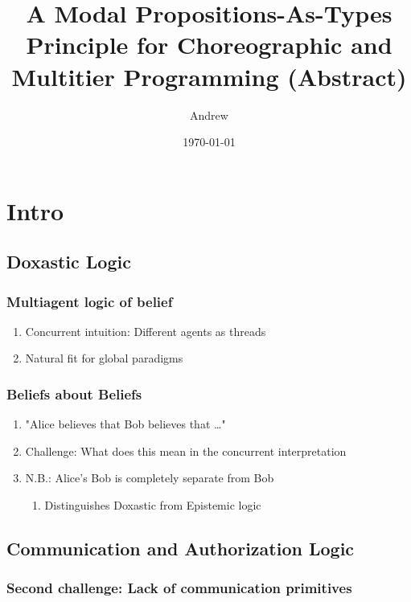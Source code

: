 \documentclass[11pt]{article}
\author{Andrew}
\date{\today}
\title{A Modal Propositions-As-Types Principle for Choreographic and Multitier Programming (Abstract)}
\begin{document}
\maketitle


\section{Intro}
\label{sec:org9bb3d42}
\subsection{Doxastic Logic}
\label{sec:org2422f84}
\subsubsection{Multiagent logic of belief}
\label{sec:org404c910}
\begin{enumerate}
\item Concurrent intuition: Different agents as threads
\label{sec:org0226ebc}
\item Natural fit for global paradigms
\label{sec:org6bacdfc}
\end{enumerate}
\subsubsection{Beliefs about Beliefs}
\label{sec:orgfdc9984}
\begin{enumerate}
\item "Alice believes that Bob believes that \ldots{}"
\label{sec:org10e2b8f}
\item Challenge: What does this mean in the concurrent interpretation
\label{sec:orgc316c3e}
\item N.B.: Alice's Bob is completely separate from Bob
\label{sec:orgf5cf8e7}
\begin{enumerate}
\item Distinguishes Doxastic from Epistemic logic
\label{sec:orgeefe951}
\end{enumerate}
\end{enumerate}
\subsection{Communication and Authorization Logic}
\label{sec:orge531c5a}
\subsubsection{Second challenge: Lack of communication primitives}
\label{sec:org1613438}
\end{document}
